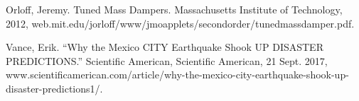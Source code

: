 \documentclass[11pt]{article}
\begin{document}




\newpage

\begin{thebibliography}{1}

 Orloff, Jeremy. Tuned Mass Dampers. Massachusetts Institute of Technology, 2012, web.mit.edu/jorloff/www/jmoapplets/secondorder/tunedmassdamper.pdf.

 Vance, Erik. “Why the Mexico CITY Earthquake Shook UP DISASTER PREDICTIONS.” Scientific American, Scientific American, 21 Sept. 2017, www.scientificamerican.com/article/why-the-mexico-city-earthquake-shook-up-disaster-predictions1/.

\end{thebibliography}
\end{document}
